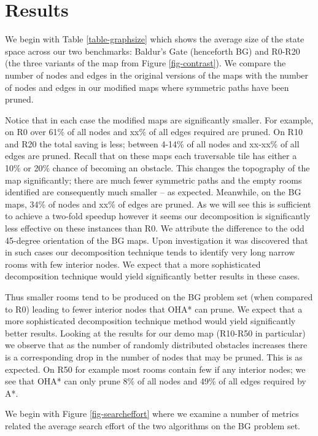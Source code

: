 \section{Results}
\label{sec-results}
We begin with Table \ref{table-graphsize} which shows the average size
of the state space across our two benchmarks: Baldur's Gate (henceforth BG) and 
R0-R20 (the three variants of the map from Figure \ref{fig-contrast}).
We compare the number of nodes and edges in the original versions of the maps
with the number of nodes and edges in our modified maps where symmetric paths 
have been pruned.

Notice that in each case the modified maps are significantly smaller.
For example, on R0 over 61\% of all nodes and xx\% of all edges required are pruned.
On R10 and R20 the total saving is less; between 4-14\% of all nodes and xx-xx\% of all edges are pruned.  
Recall that on these maps each traversable tile has either a 10\% or 20\% chance of becoming an obstacle. 
This changes the topography of the map significantly; there are much fewer 
symmetric paths and the empty rooms identified are consequently much smaller -- as expected.
Meanwhile, on the BG maps, 34\% of nodes and xx\% of edges are pruned.
As we will see this is sufficient to achieve a two-fold speedup however it seems our decomposition
is significantly less effective on these instances than R0.
We attribute the difference to the odd 45-degree orientation of the BG maps.
Upon investigation it was discovered that in such cases our decomposition technique tends to identify very 
long narrow rooms with few interior nodes. 
We expect that a more sophisticated decomposition technique would yield significantly better results
in these cases.
\par
Thus smaller rooms tend to be produced on the BG problem set (when compared to R0) leading to 
fewer interior nodes that OHA* can prune. 
We expect that a more sophisticated decomposition technique method would yield significantly 
better results.
Looking at the results for our demo map (R10-R50 in particular) we observe that as the number of 
randomly distributed obstacles increases there is a corresponding drop in the number of nodes that may be 
pruned.
This is as expected. 
On R50 for example most rooms contain few if any interior nodes; 
we see that OHA* can only prune 8\% of all nodes and 49\% of all edges required by A*.
\par
We begin with Figure \ref{fig-searcheffort} where we examine a number of metrics
related the average search effort of the two algorithms on the BG problem set.
